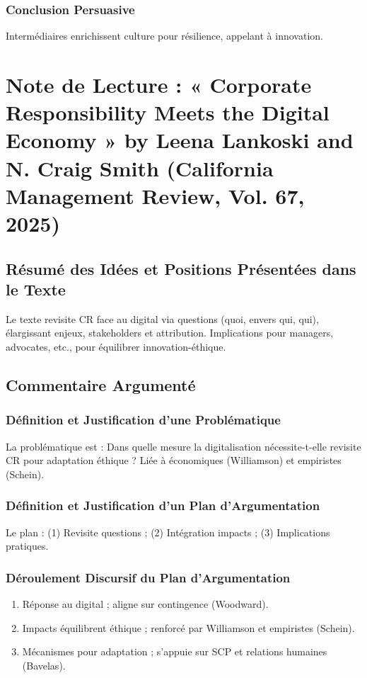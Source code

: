 \documentclass[11pt]{rapportECL}
\begin{document}
\subsubsection{Conclusion Persuasive}
Intermédiaires enrichissent culture pour résilience, appelant à innovation.

\section{Note de Lecture : « Corporate Responsibility Meets the Digital Economy » by Leena Lankoski and N. Craig Smith (California Management Review, Vol. 67, 2025)}

\subsection{Résumé des Idées et Positions Présentées dans le Texte}
Le texte revisite CR face au digital via questions (quoi, envers qui, qui), élargissant enjeux, stakeholders et attribution. Implications pour managers, advocates, etc., pour équilibrer innovation-éthique.

\subsection{Commentaire Argumenté}

\subsubsection{Définition et Justification d’une Problématique}
La problématique est : Dans quelle mesure la digitalisation nécessite-t-elle revisite CR pour adaptation éthique ? Liée à économiques (Williamson) et empiristes (Schein).

\subsubsection{Définition et Justification d’un Plan d’Argumentation}
Le plan : (1) Revisite questions ; (2) Intégration impacts ; (3) Implications pratiques.

\subsubsection{Déroulement Discursif du Plan d’Argumentation}
\begin{enumerate}
\item Réponse au digital ; aligne sur contingence (Woodward).
\item Impacts équilibrent éthique ; renforcé par Williamson et empiristes (Schein).
\item Mécanismes pour adaptation ; s’appuie sur SCP et relations humaines (Bavelas).
\end{enumerate}
\end{document}
